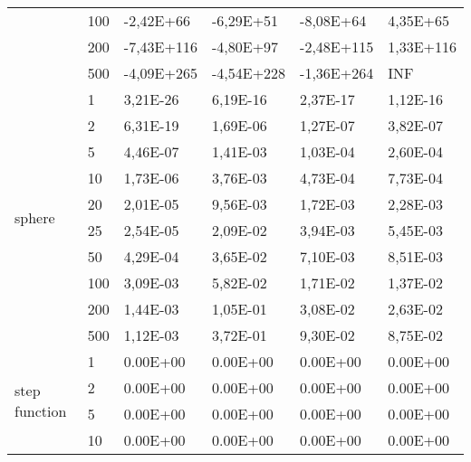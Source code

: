 \begin{longtable}[c]{|p{3.5cm}|l|l|l|l|l|}
                                        & 100       & -2,42E+66  & -6,29E+51  & -8,08E+64  & 4,35E+65  \\ \cline{2-6} 
                                        & 200       & -7,43E+116 & -4,80E+97  & -2,48E+115 & 1,33E+116 \\ \cline{2-6} 
                                        & 500       & -4,09E+265 & -4,54E+228 & -1,36E+264 & INF       \\ \hline
\multirow[t]{10}{*}{sphere}                & 1         & 3,21E-26   & 6,19E-16   & 2,37E-17   & 1,12E-16  \\ \cline{2-6} 
                                        & 2         & 6,31E-19   & 1,69E-06   & 1,27E-07   & 3,82E-07  \\ \cline{2-6} 
                                        & 5         & 4,46E-07   & 1,41E-03   & 1,03E-04   & 2,60E-04  \\ \cline{2-6} 
                                        & 10        & 1,73E-06   & 3,76E-03   & 4,73E-04   & 7,73E-04  \\ \cline{2-6} 
                                        & 20        & 2,01E-05   & 9,56E-03   & 1,72E-03   & 2,28E-03  \\ \cline{2-6} 
                                        & 25        & 2,54E-05   & 2,09E-02   & 3,94E-03   & 5,45E-03  \\ \cline{2-6} 
                                        & 50        & 4,29E-04   & 3,65E-02   & 7,10E-03   & 8,51E-03  \\ \cline{2-6} 
                                        & 100       & 3,09E-03   & 5,82E-02   & 1,71E-02   & 1,37E-02  \\ \cline{2-6} 
                                        & 200       & 1,44E-03   & 1,05E-01   & 3,08E-02   & 2,63E-02  \\ \cline{2-6} 
                                        & 500       & 1,12E-03   & 3,72E-01   & 9,30E-02   & 8,75E-02  \\ \hline
\multirow[t]{10}{*}{step function}         & 1         & 0.00E+00   & 0.00E+00   & 0.00E+00   & 0.00E+00  \\ \cline{2-6} 
                                        & 2         & 0.00E+00   & 0.00E+00   & 0.00E+00   & 0.00E+00  \\ \cline{2-6} 
                                        & 5         & 0.00E+00   & 0.00E+00   & 0.00E+00   & 0.00E+00  \\ \cline{2-6} 
                                        & 10        & 0.00E+00   & 0.00E+00   & 0.00E+00   & 0.00E+00  \\ \cline{2-6} 

\end{longtable}
